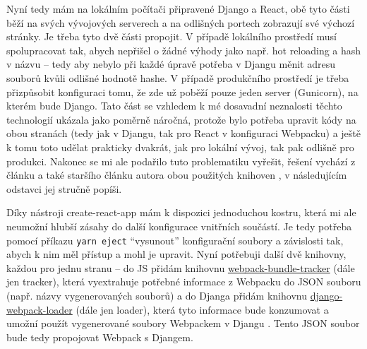     Nyní tedy mám na lokálním počítači připravené Django a React, obě tyto části běží na svých vývojových serverech a na odlišných portech zobrazují své výchozí stránky. Je třeba tyto dvě části propojit. V případě lokálního prostředí musí spolupracovat tak, abych nepřišel o žádné výhody jako např. hot reloading a hash v názvu -- tedy aby nebylo při každé úpravě potřeba v Djangu měnit adresu souborů kvůli odlišné hodnotě hashe. V případě produkčního prostředí je třeba přizpůsobit konfiguraci tomu, že zde už poběží pouze jeden server (Gunicorn), na kterém bude Django. Tato část se vzhledem k mé dosavadní neznalosti těchto technologií ukázala jako poměrně náročná, protože bylo potřeba upravit kódy na obou stranách (tedy jak v Djangu, tak pro React v konfiguraci Webpacku) a ještě k tomu toto udělat prakticky dvakrát, jak pro lokální vývoj, tak pak odlišně pro produkci. Nakonec se mi ale podařilo tuto problematiku vyřešit, řešení vychází z článku \cite{webpack-loader2} a také staršího článku autora obou použitých knihoven \cite{webpack-loader1}, v následujícím odstavci jej stručně popíši.
    
    Díky nástroji create-react-app \cite{cra} mám k dispozici jednoduchou kostru, která mi ale neumožní hlubší zásahy do další konfigurace vnitřních součástí. Je tedy potřeba pomocí příkazu \verb|yarn eject| \enquote{vysunout} konfigurační soubory a závislosti tak, abych k nim měl přístup a mohl je upravit. Nyní potřebuji další dvě knihovny, každou pro jednu stranu -- do JS přidám knihovnu \href{https://github.com/owais/webpack-bundle-tracker}{webpack-bundle-tracker} (dále jen tracker), která vyextrahuje potřebné informace z Webpacku do JSON souboru \cite{webpack-bundle-tracker} (např. názvy vygenerovaných souborů) a do Djanga přidám knihovnu \href{https://github.com/owais/django-webpack-loader}{django-webpack-loader} (dále jen loader), která tyto informace bude konzumovat a umožní použít vygenerované soubory Webpackem v Djangu \cite{django-webpack-loader}. Tento JSON soubor bude tedy propojovat Webpack s Djangem.
    
